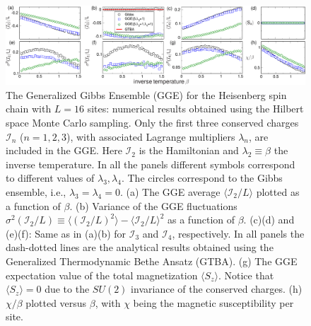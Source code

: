 \documentclass[twocolumn,superscriptaddress,prb,10pt]{revtex4-1}
\begin{document}
\begin{figure}[t]
\includegraphics*[width=0.93\linewidth]{./draft_figs/fig1}
\caption{The Generalized Gibbs Ensemble (GGE) for the Heisenberg spin chain with 
 $L=16$ sites: numerical results obtained using the Hilbert space Monte 
 Carlo sampling. Only the first three conserved charges ${\mathcal I}_n$ ($n=1,2,3$), 
 with associated Lagrange multipliers $\lambda_n$, are included in the GGE. Here 
 ${\mathcal I}_2$ is the Hamiltonian and $\lambda_2\equiv\beta$ the inverse 
 temperature. In all the panels different symbols correspond to different  values 
 of $\lambda_3,\lambda_4$. The circles correspond to the Gibbs ensemble, i.e., 
 $\lambda_3=\lambda_4=0$. (a) The GGE average $\langle {\mathcal I}_2/L\rangle$ 
 plotted as a function of $\beta$. (b) Variance of the GGE fluctuations $\sigma^2(
 {\mathcal I}_2/L)\equiv \langle ({\mathcal I}_2/L)^2\rangle-\langle {\mathcal I}_2/L
 \rangle^2$ as a function of $\beta$. (c)(d) and (e)(f): Same as in (a)(b) for 
 ${\mathcal I}_3$ and ${\mathcal I}_4$, respectively. In all panels the dash-dotted 
 lines  are the analytical results obtained using the Generalized Thermodynamic Bethe 
 Ansatz (GTBA). (g) The GGE expectation value of the total magnetization 
 $\langle S_z\rangle$. Notice that $\langle S_z\rangle=0$ due to the $SU(2)$ 
 invariance of the conserved charges. (h) $\chi/\beta$ plotted versus $\beta$, with 
 $\chi$ being the magnetic susceptibility per site. 
}
\label{fig1}
\end{figure}
\end{document}
